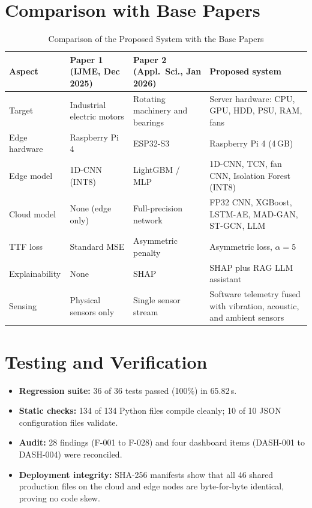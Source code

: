 \documentclass[12pt,a4paper]{report}
\begin{document}
\section{Comparison with Base Papers}
\begin{table}[h!]
  \centering
  \caption{Comparison of the Proposed System with the Base Papers}
  \label{tab:compare}
  \vspace*{5pt}
  \footnotesize
  \renewcommand{\arraystretch}{1.4}
  \begin{tabular}{|p{2.4cm}|p{3.1cm}|p{3.1cm}|p{4.2cm}|}
    \hline
    \textbf{Aspect} & \textbf{Paper 1 (IJME, Dec 2025)} & \textbf{Paper 2 (Appl.\ Sci., Jan 2026)} & \textbf{Proposed system} \\ \hline
    Target & Industrial electric motors & Rotating machinery and bearings & Server hardware: CPU, GPU, HDD, PSU, RAM, fans \\ \hline
    Edge hardware & Raspberry Pi 4 & ESP32-S3 & Raspberry Pi 4 (4\,GB) \\ \hline
    Edge model & 1D-CNN (INT8) & LightGBM / MLP & 1D-CNN, TCN, fan CNN, Isolation Forest (INT8) \\ \hline
    Cloud model & None (edge only) & Full-precision network & FP32 CNN, XGBoost, LSTM-AE, MAD-GAN, ST-GCN, LLM \\ \hline
    TTF loss & Standard MSE & Asymmetric penalty & Asymmetric loss, $\alpha=5$ \\ \hline
    Explainability & None & SHAP & SHAP plus RAG LLM assistant \\ \hline
    Sensing & Physical sensors only & Single sensor stream & Software telemetry fused with vibration, acoustic, and ambient sensors \\ \hline
  \end{tabular}
\end{table}

\section{Testing and Verification}
\begin{itemize}
  \item \textbf{Regression suite:} 36 of 36 tests passed (100\%) in 65.82\,s.
  \item \textbf{Static checks:} 134 of 134 Python files compile cleanly; 10 of 10 JSON configuration files validate.
  \item \textbf{Audit:} 28 findings (F-001 to F-028) and four dashboard items (DASH-001 to DASH-004) were reconciled.
  \item \textbf{Deployment integrity:} SHA-256 manifests show that all 46 shared production files on the cloud and edge nodes are byte-for-byte identical, proving no code skew.
\end{itemize}
\end{document}
